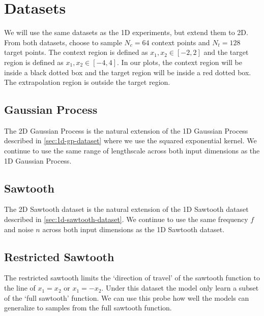 \documentclass[../../main.tex]{subfiles}
\begin{document}
\section{Datasets}

We will use the same datasets as the 1D experiments, but extend them to 2D. From both datasets, choose to sample $N_c = 64$ context points and $N_t = 128$ target points. The context region is defined as $x_1, x_2 \in [-2, 2]$ and the target region is defined as $x_1, x_2 \in [-4, 4]$.  In our plots, the context region will be inside a black dotted box and the target region will be inside a red dotted box. The extrapolation region is outside the target region.

\subsection{Gaussian Process}

The 2D Gaussian Process is the natural extension of the 1D Gaussian Process described in \autoref{sec:1d-gp-dataset} where we use the squared exponential kernel. We continue to use the same range of lengthscale across both input dimensions as the 1D Gaussian Process. 




\subsection{Sawtooth}

The 2D Sawtooth dataset is the natural extension of the 1D Sawtooth dataset described in \autoref{sec:1d-sawtooth-dataset}. We continue to use the same frequency $f$ and noise $n$ across both input dimensions as the 1D Sawtooth dataset.



\subsection{Restricted Sawtooth}

The restricted sawtooth limits the `direction of travel' of the sawtooth function to the line of $x_1 = x_2$ or $x_1 = -x_2$. Under this dataset the model only learn a subset of the `full sawtooth' function. We can use this probe how well the models can generalize to samples from the full sawtooth function.
\end{document}
